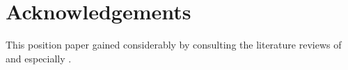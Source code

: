 \documentclass[11pt]{article}
\begin{document}
\section*{Acknowledgements}
This position paper gained considerably by consulting the literature reviews of  and  especially .
%
%


\end{document}
